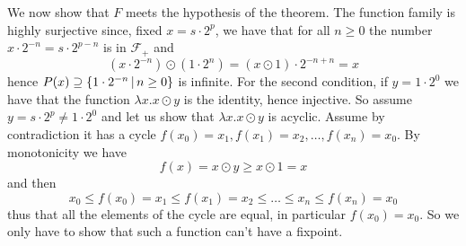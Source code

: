\begin{example}
	We now show that $F$ meets the hypothesis of the theorem.
	The function family is highly surjective since, fixed $x = s \cdot 2^p$, we have that for all $n \ge 0$ the number
	$x \cdot 2^{-n} = s \cdot 2^{p-n}$ is in $\mathcal{F_+}$ and
	\[
	(x \cdot 2^{-n}) \odot (1 \cdot 2^{n}) = (x \odot 1) \cdot 2^{-n+n} = x
	\]
	hence $P(x) \supseteq \{ 1 \cdot 2^{-n} \,\vert\, n \ge 0 \}$ is infinite.
	For the second condition, if $y = 1 \cdot 2^{0}$ we have that the function $\lambda x. x \odot y$ is the identity, hence injective. So assume $y = s \cdot 2^p \neq 1 \cdot 2^0$ and let us show that $\lambda x. x \odot y$ is acyclic. Assume by contradiction it has a cycle $f(x_0) = x_1, f(x_1) = x_2, \dots, f(x_n) = x_0$. By monotonicity we have
	\[
	f(x) = x \odot y \ge x \odot 1 = x
	\]
	and then
	\[
	x_0 \le f(x_0) = x_1 \le f(x_1) = x_2 \le \dots \le x_n \le f(x_n) = x_0
	\]
	thus that all the elements of the cycle are equal, in particular $f(x_0) = x_0$. So we only have to show that such a function can't have a fixpoint.


\end{example}
